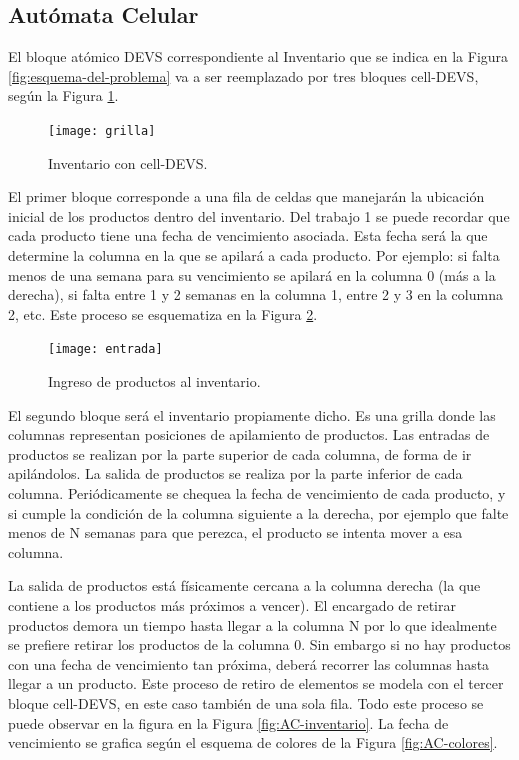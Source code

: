 \documentclass[10pt]{article}
\begin{document}
\subsection{Autómata Celular\label{sec:AC}} 

 El bloque atómico DEVS correspondiente al Inventario que se indica en la Figura \ref{fig:esquema-del-problema} va a ser reemplazado por tres bloques cell-DEVS, según la Figura \ref{fig:AC-esquematico}.
 
 \begin{figure}[h] 
 	\centering
 	\texttt{[image: grilla]} 
 	\caption{Inventario con cell-DEVS.} 
 	\label{fig:AC-esquematico} 
 \end{figure}
 \FloatBarrier
 
 El primer bloque corresponde a una fila de celdas que manejarán la ubicación inicial de los productos dentro del inventario. Del trabajo 1 se puede recordar que cada producto tiene una fecha de vencimiento asociada. Esta fecha será la que determine la columna en la que se apilará a cada producto. Por ejemplo: si falta menos de una semana para su vencimiento se apilará en la columna 0 (más a la derecha), si falta entre 1 y 2 semanas en la columna 1, entre 2 y 3 en la columna 2, etc. Este proceso se esquematiza en la Figura \ref{fig:AC-ingreso-de-productos}.
 
 \begin{figure}[h] 
 	\centering 
 	\texttt{[image: entrada]} 
 	\caption{Ingreso de productos al inventario.} 
 	\label{fig:AC-ingreso-de-productos} 
 \end{figure}
 \FloatBarrier
 
 El segundo bloque será el inventario propiamente dicho. Es una grilla donde las columnas representan posiciones de apilamiento de productos. Las entradas de productos se realizan por la parte superior de cada columna, de forma de ir apilándolos. La salida de productos se realiza por la parte inferior de cada columna. Periódicamente se chequea la fecha de vencimiento de cada producto, y si cumple la condición de la columna siguiente a la derecha, por ejemplo que falte menos de N semanas para que perezca, el producto se intenta mover a esa columna.
 
 La salida de productos está físicamente cercana a la columna derecha (la que contiene a los productos más próximos a vencer). El encargado de retirar productos demora un tiempo hasta llegar a la columna N por lo que idealmente se prefiere retirar los productos de la columna 0. Sin embargo si no hay productos con una fecha de vencimiento tan próxima, deberá recorrer las columnas hasta llegar a un producto. Este proceso de retiro de elementos se modela con el tercer bloque cell-DEVS, en este caso también de una sola fila.
 Todo este proceso se puede observar en la figura en la Figura \ref{fig:AC-inventario}. La fecha de vencimiento se grafica según el esquema de colores de la Figura \ref{fig:AC-colores}.
 
\end{document}
